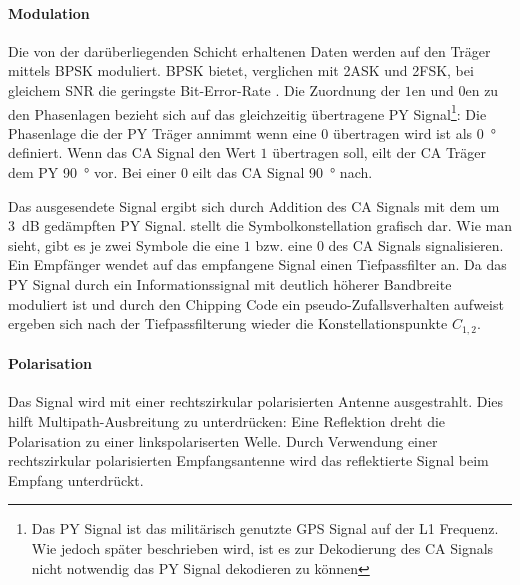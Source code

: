 \paragraph{Modulation}
Die von der darüberliegenden Schicht erhaltenen Daten werden auf den Träger mittels \gls{BPSK} moduliert. \gls{BPSK} bietet, verglichen mit 2ASK und 2FSK, bei gleichem \gls{SNR} die geringste Bit-Error-Rate \cite{dixon1998radio}. Die Zuordnung der $1$en und $0$en zu den Phasenlagen bezieht sich auf das gleichzeitig übertragene \gls{PY} Signal\footnote{Das \gls{PY} Signal ist das militärisch genutzte GPS Signal auf der L1 Frequenz. Wie jedoch später beschrieben wird, ist es zur Dekodierung des \gls{CA} Signals nicht notwendig das \gls{PY} Signal dekodieren zu können}: Die Phasenlage die der \gls{PY} Träger annimmt wenn eine $0$ übertragen wird ist als \SI{0}{\degree} definiert. Wenn das \gls{CA} Signal den Wert $1$ übertragen soll, eilt der \gls{CA} Träger dem \gls{PY} \SI{90}{\degree} vor. Bei einer $0$ eilt das CA Signal \SI{90}{\degree} nach.

Das ausgesendete Signal ergibt sich durch Addition des \gls{CA} Signals mit dem um \SI{3}{\dB} gedämpften \gls{PY} Signal.  stellt die Symbolkonstellation grafisch dar. Wie man sieht, gibt es je zwei Symbole die eine $1$ bzw. eine $0$ des CA Signals signalisieren. Ein Empfänger wendet auf das empfangene Signal einen Tiefpassfilter an. Da das \gls{PY} Signal durch ein Informationssignal mit deutlich höherer Bandbreite moduliert ist und durch den Chipping Code ein pseudo-Zu\-falls\-ver\-hal\-ten aufweist ergeben sich nach der Tiefpassfilterung wieder die Konstellationspunkte $C_{1,2}$.


\paragraph{Polarisation} Das Signal wird mit einer rechtszirkular polarisierten Antenne ausgestrahlt. Dies hilft Multipath-Ausbreitung zu unterdrücken: Eine Reflektion dreht die Polarisation zu einer linkspolariserten Welle. Durch Verwendung einer rechtszirkular polarisierten Empfangsantenne wird das reflektierte Signal beim Empfang unterdrückt.

